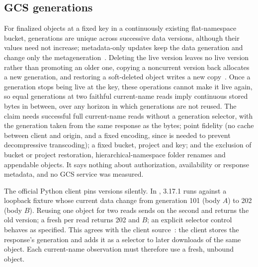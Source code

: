 \subsection{GCS generations}
For finalized objects at a fixed key in a continuously existing flat-namespace
bucket, generations are unique across successive data versions, although their
values need not increase; metadata-only updates keep the data generation and
change only the metageneration~\cite{gcsmetadata}. Deleting the live version
leaves no live version rather than promoting an older one, copying a
noncurrent version back allocates a new generation, and restoring a
soft-deleted object writes a new copy~\cite{gcsversioning}. Once a generation
stops being live at the key, these operations cannot make it live again, so
equal generations at two faithful current-name reads imply continuous stored
bytes in between, over any horizon in which generations are not reused. The
claim needs successful full current-name reads without a generation selector,
with the generation taken from the same response as the bytes; point fidelity
(no cache between client and origin, and a fixed encoding, since
 is needed to prevent decompressive transcoding); a
fixed bucket, project and key; and the exclusion of bucket or project
restoration, hierarchical-namespace folder renames and appendable objects. It
says nothing about authorization, availability or response metadata, and no
GCS service was measured.

The official Python client pins versions silently. In
,  3.17.1 runs
against a loopback fixture whose current data change from generation 101 (body
$A$) to 202 (body $B$). Reusing one  object for two reads sends
 on the second and returns the old version; a fresh
 per read returns 202 and $B$; an explicit selector control behaves
as specified. This agrees with the client source~\cite{gcssdk}: the client
stores the response's generation and adds it as a selector to later downloads
of the same object. Each current-name observation must therefore use a fresh,
unbound object.

